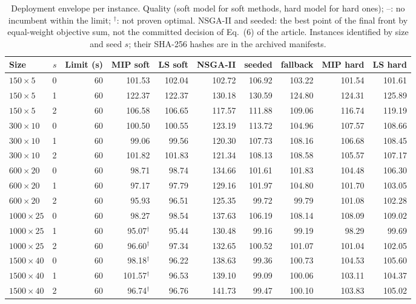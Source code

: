 \begin{table}[h]
\centering
\caption{Deployment envelope per instance. Quality (soft model for soft methods, hard model for hard ones); --: no incumbent within the limit; $^\dagger$: not proven optimal. NSGA-II and seeded: the best point of the final front by equal-weight objective sum, not the committed decision of Eq.~(6) of the article. Instances identified by size and seed $s$; their SHA-256 hashes are in the archived manifests.\label{tab:envelope-instances}}
\scriptsize
\setlength{\tabcolsep}{3pt}
\begin{tabular}{lrrrrrrrrr}
\toprule
Size & $s$ & Limit (s) & MIP soft & LS soft & NSGA-II & seeded & fallback & MIP hard & LS hard\\
\midrule
$150\times5$ & 0 & 60 & 101.53 & 102.04 & 102.72 & 106.92 & 103.22 & 101.54 & 101.61\\
$150\times5$ & 1 & 60 & 122.37 & 122.37 & 130.18 & 130.59 & 124.80 & 124.31 & 125.89\\
$150\times5$ & 2 & 60 & 106.58 & 106.65 & 117.57 & 111.88 & 109.06 & 116.74 & 119.19\\
$300\times10$ & 0 & 60 & 100.50 & 100.55 & 123.19 & 113.72 & 104.96 & 107.57 & 108.66\\
$300\times10$ & 1 & 60 & 99.06 & 99.56 & 120.30 & 107.73 & 108.16 & 106.68 & 108.45\\
$300\times10$ & 2 & 60 & 101.82 & 101.83 & 121.34 & 108.13 & 108.58 & 105.57 & 107.17\\
$600\times20$ & 0 & 60 & 98.71 & 98.74 & 134.66 & 101.61 & 101.83 & 104.48 & 106.30\\
$600\times20$ & 1 & 60 & 97.17 & 97.79 & 129.16 & 101.97 & 104.80 & 101.70 & 103.05\\
$600\times20$ & 2 & 60 & 95.93 & 96.51 & 125.35 & 99.72 & 99.79 & 101.08 & 102.28\\
$1000\times25$ & 0 & 60 & 98.27 & 98.54 & 137.63 & 106.19 & 108.14 & 108.09 & 109.02\\
$1000\times25$ & 1 & 60 & 95.07$^\dagger$ & 95.44 & 130.48 & 99.16 & 99.19 & 98.29 & 99.69\\
$1000\times25$ & 2 & 60 & 96.60$^\dagger$ & 97.34 & 132.65 & 100.52 & 101.07 & 101.04 & 102.05\\
$1500\times40$ & 0 & 60 & 98.18$^\dagger$ & 96.22 & 138.63 & 99.36 & 100.73 & 104.53 & 105.60\\
$1500\times40$ & 1 & 60 & 101.57$^\dagger$ & 96.53 & 139.10 & 99.09 & 100.06 & 103.11 & 104.37\\
$1500\times40$ & 2 & 60 & 96.74$^\dagger$ & 96.76 & 141.73 & 99.47 & 100.10 & 103.83 & 105.02\\

\end{tabular}
\end{table}

